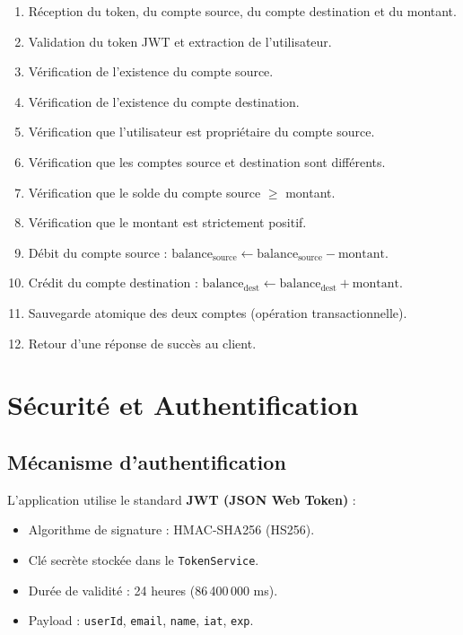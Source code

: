 \documentclass[12pt,a4paper]{article}
\begin{document}
\begin{enumerate}
    \item Réception du token, du compte source, du compte destination et du montant.
    \item Validation du token JWT et extraction de l'utilisateur.
    \item Vérification de l'existence du compte source.
    \item Vérification de l'existence du compte destination.
    \item Vérification que l'utilisateur est propriétaire du compte source.
    \item Vérification que les comptes source et destination sont différents.
    \item Vérification que le solde du compte source $\geq$ montant.
    \item Vérification que le montant est strictement positif.
    \item Débit du compte source : $\text{balance}_{\text{source}} \leftarrow \text{balance}_{\text{source}} - \text{montant}$.
    \item Crédit du compte destination : $\text{balance}_{\text{dest}} \leftarrow \text{balance}_{\text{dest}} + \text{montant}$.
    \item Sauvegarde atomique des deux comptes (opération transactionnelle).
    \item Retour d'une réponse de succès au client.
\end{enumerate}

\section{Sécurité et Authentification}

\subsection{Mécanisme d'authentification}
L'application utilise le standard \textbf{JWT (JSON Web Token)} :

\begin{itemize}
    \item Algorithme de signature : HMAC-SHA256 (HS256).
    \item Clé secrète stockée dans le \texttt{TokenService}.
    \item Durée de validité : 24 heures (86\,400\,000 ms).
    \item Payload : \texttt{userId}, \texttt{email}, \texttt{name}, \texttt{iat}, \texttt{exp}.
\end{itemize}
\end{document}
